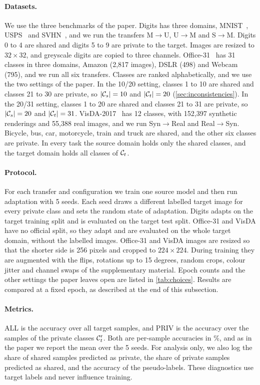 \paragraph{Datasets.}
We use the three benchmarks of the paper.
Digits has three domains, MNIST~\citep{lecun1998mnist}, USPS~\citep{hull1994usps} and SVHN~\citep{netzer2011svhn}, and we run the transfers M$\to$U, U$\to$M and S$\to$M.
Digits 0 to 4 are shared and digits 5 to 9 are private to the target.
Images are resized to $32\times32$, and greyscale digits are copied to three channels.
Office-31~\citep{saenko2010office} has 31 classes in three domains, Amazon (2{,}817 images), DSLR (498) and Webcam (795), and we run all six transfers.
Classes are ranked alphabetically, and we use the two settings of the paper.
In the 10/20 setting, classes 1 to 10 are shared and classes 21 to 30 are private, so $|\mathcal{C}_s|=10$ and $|\mathcal{C}_t|=20$ (\cref{sec:inconsistencies}).
In the 20/31 setting, classes 1 to 20 are shared and classes 21 to 31 are private, so $|\mathcal{C}_s|=20$ and $|\mathcal{C}_t|=31$.
VisDA-2017~\citep{peng2017visda} has 12 classes, with 152{,}397 synthetic renderings and 55{,}388 real images, and we run Syn$\to$Real and Real$\to$Syn.
Bicycle, bus, car, motorcycle, train and truck are shared, and the other six classes are private.
In every task the source domain holds only the shared classes, and the target domain holds all classes of $\mathcal{C}_t$.

\paragraph{Protocol.}
For each transfer and configuration we train one source model and then run adaptation with 5 seeds.
Each seed draws a different labelled target image for every private class and sets the random state of adaptation.
Digits adapts on the target training split and is evaluated on the target test split.
Office-31 and VisDA have no official split, so they adapt and are evaluated on the whole target domain, without the labelled images.
Office-31 and VisDA images are resized so that the shorter side is 256 pixels and cropped to $224\times224$.
During training they are augmented with the flips, rotations up to 15 degrees, random crops, colour jitter and channel swaps of the supplementary material.
Epoch counts and the other settings the paper leaves open are listed in \cref{tab:choices}.
Results are compared at a fixed epoch, as described at the end of this subsection.

\paragraph{Metrics.}
ALL is the accuracy over all target samples, and PRIV is the accuracy over the samples of the private classes $\mathcal{C}'_t$.
Both are per-sample accuracies in \%, and as in the paper we report the mean over the 5 seeds.
For analysis only, we also log the share of shared samples predicted as private, the share of private samples predicted as shared, and the accuracy of the pseudo-labels.
These diagnostics use target labels and never influence training.

